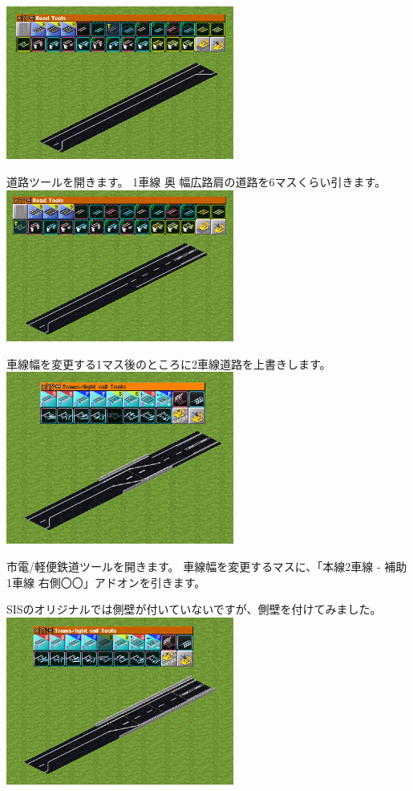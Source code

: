 \documentclass{jbook}
\begin{document}
\begin{multicols}{2}
\includegraphics[width = 75mm]{picture/20210214-road-4-1.png}

道路ツールを開きます。
1車線 奥 幅広路肩の道路を6マスくらい引きます。\\

\includegraphics[width = 75mm]{picture/20210214-road-4-2.png}

車線幅を変更する1マス後のところに2車線道路を上書きします。\\


\includegraphics[width = 75mm]{picture/20210214-road-4-3.png}

市電/軽便鉄道ツールを開きます。
車線幅を変更するマスに、「本線2車線 - 補助1車線 右側〇〇」アドオンを引きます。

SISのオリジナルでは側壁が付いていないですが、側壁を付けてみました。\\

\includegraphics[width = 75mm]{picture/20210214-road-4-4.png}


\end{multicols}
\end{document}
